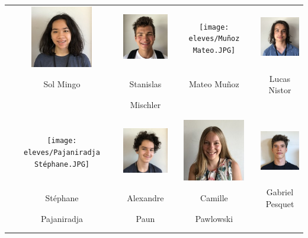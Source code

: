 \begin{center}
\begin{tabular}{cccc}
\includegraphics[angle=270,origin=c, width=27mm]{eleves/Mingo Sol.JPG} &
\includegraphics[angle=270,origin=c, width=27mm]{eleves/Mischler Stanislas.JPG} &
\texttt{[image: eleves/Muñoz Mateo.JPG]} &
\includegraphics[angle=270,origin=c, width=27mm]{eleves/Nistor Lucas.JPG} \\
Sol Mingo & Stanislas & Mateo Muñoz & Lucas Nistor \\ & Mischler & & \\ \\ \\

\texttt{[image: eleves/Pajaniradja Stéphane.JPG]} &
\includegraphics[angle=270,origin=c, width=27mm]{eleves/Paun Alexandre.JPG} &
\includegraphics[angle=270,origin=c, width=27mm]{eleves/Pawlowski Camille.JPG} &
\includegraphics[angle=270,origin=c, width=27mm]{eleves/Pesquet Gabriel.JPG} \\
Stéphane & Alexandre & Camille & Gabriel Pesquet \\ Pajaniradja & Paun & Pawlowski & \\ \\ \\


\end{tabular}
\end{center}
